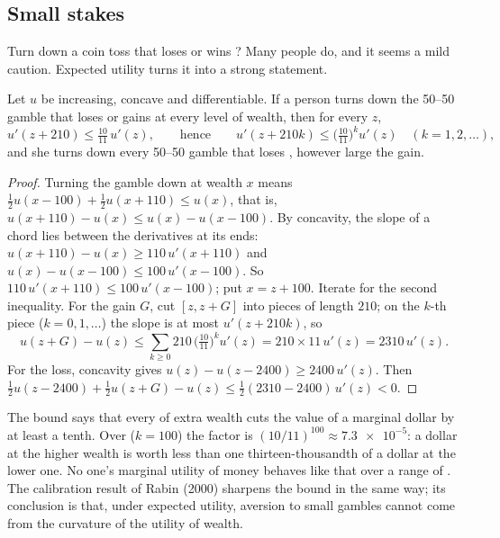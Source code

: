 \subsection{Small stakes}

Turn down a coin toss that loses  or wins ? Many people do, and it seems a mild
caution. Expected utility turns it into a strong statement.

\begin{proposition}\label{prop:b2:expected-utility:calibration}
Let $u$ be increasing, concave and differentiable. If a person turns down the 50--50 gamble that loses
 or gains  at every level of wealth, then for every $z$,
\[
u'(z + 210) \le \tfrac{10}{11}\,u'(z), \qquad\text{hence}\qquad u'(z + 210k) \le
\bigl(\tfrac{10}{11}\bigr)^{k} u'(z) \quad (k = 1, 2, \dots),
\]
and she turns down every 50--50 gamble that loses , however large the gain.
\end{proposition}

\begin{proof}
Turning the gamble down at wealth $x$ means $\tfrac12 u(x - 100) + \tfrac12 u(x + 110) \le u(x)$,
that is, $u(x + 110) - u(x) \le u(x) - u(x - 100)$. By concavity, the slope of a chord lies between the
derivatives at its ends: $u(x + 110) - u(x) \ge 110\,u'(x + 110)$ and $u(x) - u(x - 100) \le
100\,u'(x - 100)$. So $110\,u'(x + 110) \le 100\,u'(x - 100)$; put $x = z + 100$. Iterate for the
second inequality. For the gain $G$, cut $[z, z + G]$ into pieces of length $210$; on the $k$-th piece
($k = 0, 1, \dots$) the slope is at most $u'(z + 210k)$, so
\[
u(z + G) - u(z) \le \sum_{k \ge 0} 210\,\bigl(\tfrac{10}{11}\bigr)^{k} u'(z) = 210 \times 11\,u'(z) =
\num{2310}\,u'(z).
\]
For the loss, concavity gives $u(z) - u(z - \num{2400}) \ge \num{2400}\,u'(z)$. Then $\tfrac12 u(z -
\num{2400}) + \tfrac12 u(z + G) - u(z) \le \tfrac12(\num{2310} - \num{2400})\,u'(z) < 0$.
\end{proof}

The bound says that every  of extra wealth cuts the value of a marginal dollar by at least a
tenth. Over  ($k = 100$) the factor is $(10/11)^{100} \approx \num{7.3e-5}$: a dollar at
the higher wealth is worth less than one thirteen-thousandth of a dollar at the lower one. No one's
marginal utility of money behaves like that over a range of . The calibration result of
Rabin (2000) sharpens the bound in the same way; its conclusion is that, under expected utility,
aversion to small gambles cannot come from the curvature of the utility of wealth.

